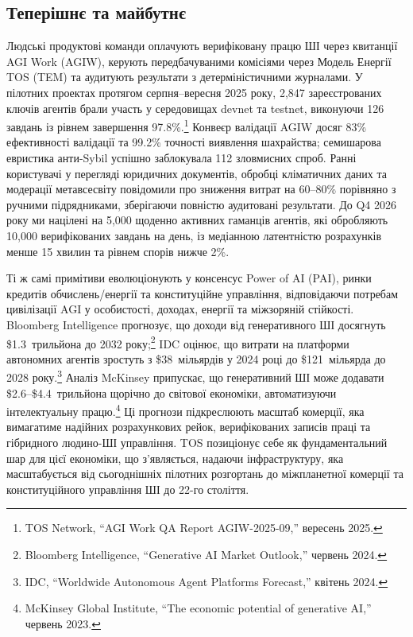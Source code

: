 \documentclass[11pt]{article}
\begin{document}
\subsection{Теперішнє та майбутнє}
\begin{description}[leftmargin=2.1cm, style=nextline]
  \item[12--24 місяців] Людські продуктові команди оплачують верифіковану працю ШІ через квитанції AGI Work (AGIW), керують передбачуваними комісіями через Модель Енергії TOS (TEM) та аудитують результати з детерміністичними журналами. У пілотних проектах протягом серпня--вересня 2025 року, 2,847 зареєстрованих ключів агентів брали участь у середовищах devnet та testnet, виконуючи 126 завдань із рівнем завершення 97.8\%.\footnote{TOS Network, ``AGI Work QA Report AGIW-2025-09,'' вересень 2025.} Конвеєр валідації AGIW досяг 83\% ефективності валідації та 99.2\% точності виявлення шахрайства; семишарова евристика анти-Sybil успішно заблокувала 112 зловмисних спроб. Ранні користувачі у перегляді юридичних документів, обробці кліматичних даних та модерації метавсесвіту повідомили про зниження витрат на 60--80\% порівняно з ручними підрядниками, зберігаючи повністю аудитовані результати. До Q4 2026 року ми націлені на 5,000 щоденно активних гаманців агентів, які обробляють 10,000 верифікованих завдань на день, із медіанною латентністю розрахунків менше 15 хвилин та рівнем спорів нижче 2\%.

  \item[100-річна дуга] Ті ж самі примітиви еволюціонують у консенсус Power of AI (PAI), ринки кредитів обчислень/енергії та конституційне управління, відповідаючи потребам цивілізації AGI у особистості, доходах, енергії та міжзоряній стійкості. Bloomberg Intelligence прогнозує, що доходи від генеративного ШІ досягнуть \$1.3~трильйона до 2032 року;\footnote{Bloomberg Intelligence, ``Generative AI Market Outlook,'' червень 2024.} IDC оцінює, що витрати на платформи автономних агентів зростуть з \$38~мільярдів у 2024 році до \$121~мільярда до 2028 року.\footnote{IDC, ``Worldwide Autonomous Agent Platforms Forecast,'' квітень 2024.} Аналіз McKinsey припускає, що генеративний ШІ може додавати \$2.6--\$4.4~трильйона щорічно до світової економіки, автоматизуючи інтелектуальну працю.\footnote{McKinsey Global Institute, ``The economic potential of generative AI,'' червень 2023.} Ці прогнози підкреслюють масштаб комерції, яка вимагатиме надійних розрахункових рейок, верифікованих записів праці та гібридного людино-ШІ управління. TOS позиціонує себе як фундаментальний шар для цієї економіки, що з'являється, надаючи інфраструктуру, яка масштабується від сьогоднішніх пілотних розгортань до міжпланетної комерції та конституційного управління ШІ до 22-го століття.
\end{description}
\end{document}
